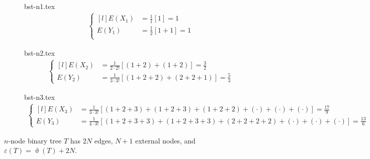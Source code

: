 \documentclass[12pt,a4paper,oneside]{report}
\begin{document}
\begin{description}
	\item[]
		{bst-n1.tex}
		\begin{align*}
			\left\{\begin{matrix*}[l]
				E(X_1) &= \frac{1}{1} \left[1\right] = 1 \\
				E(Y_1) &= \frac{1}{2} \left[1+1\right] = 1 \\
			\end{matrix*}\right.
		\end{align*}
	\item[]
		{bst-n2.tex}
		\begin{align*}
			\left\{\begin{matrix*}[l]
				E(X_2) &= \frac{1}{2 \cdot 2!} \left[(1+2) + (1+2)\right] 
						= \frac{3}{2} \\
				E(Y_2) &= \frac{1}{3 \cdot 3!} \left[(1+2+2) + (2+2+1)\right] 
						= \frac{5}{3}
			\end{matrix*}\right.
		\end{align*}
	\item[]
		{bst-n3.tex}
		\begin{align*}
			\left\{\begin{matrix*}[l]
				E(X_3) &= \frac{1}{3 \cdot 3!} \left[(1+2+3) + (1+2+3) +
							(1+2+2) + (\cdot) + (\cdot) + (\cdot) \right]
						= \frac{17}{9} \\
				E(Y_3) &= \frac{1}{4 \cdot 3!} \left[(1+2+3+3) + (1+2+3+3) +
							(2+2+2+2) + (\cdot) + (\cdot) + (\cdot) \right] 
						= \frac{13}{6}
			\end{matrix*}\right.
		\end{align*}
\end{description}

\begin{theorem}
$n$-node binary tree $T$ has $2N$ edges, $N+1$ external nodes, and $\varepsilon(T)=\upvartheta(T)+2N$. 
\end{theorem}
\end{document}
